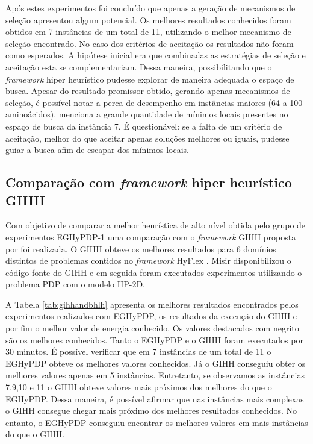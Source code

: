 	Após estes experimentos foi concluído que apenas a geração de mecanismos de seleção apresentou algum potencial. Os melhores resultados conhecidos foram obtidos em 7 instâncias de um total de 11, utilizando o melhor mecanismo de seleção encontrado. No caso dos critérios de aceitação os resultados não foram como esperados. A hipótese inicial era que combinadas as estratégias de seleção e aceitação esta se complementariam. Dessa maneira, possibilitando que o \textit{framework} hiper heurístico pudesse explorar de maneira adequada o espaço de busca. Apesar do resultado promissor obtido, gerando apenas mecanismos de seleção, é possível notar a perca de desempenho em instâncias maiores (64 a 100 aminoácidos). \cite{santanna2008} menciona a grande quantidade de mínimos locais presentes no espaço de busca da instância 7. É questionável: se a falta de um critério de aceitação, melhor do que aceitar apenas soluções melhores ou iguais, pudesse guiar a busca afim de escapar dos mínimos locais. 

	
	
	\subsection{Comparação com \textit{framework} hiper heurístico GIHH}
	
	Com objetivo de comparar a melhor heurística de alto nível obtida pelo grupo de experimentos EGHyPDP-1 uma comparação com o \textit{framework} GIHH proposta por \cite{misir2012intelligent} foi realizada. O GIHH obteve os melhores resultados para 6  domínios distintos de problemas contidos no \textit{framework} HyFlex \cite{ochoa2012hyflex}. Misir disponibilizou o código fonte do GIHH e em seguida foram executados experimentos utilizando o problema PDP com o modelo HP-2D.
	
	A Tabela \ref{tab:gihhandbhlh} apresenta os melhores resultados encontrados pelos experimentos realizados com EGHyPDP, os resultados da execução do GIHH e por fim o melhor valor de energia conhecido. Os valores destacados com negrito são os melhores conhecidos. Tanto o EGHyPDP e o GIHH foram executados por 30 minutos. É possível verificar que em 7 instâncias de um total de 11 o EGHyPDP obteve os melhores valores conhecidos. Já o GIHH conseguiu obter os melhores valores apenas em 5 instâncias. Entretanto, se observamos as instâncias 7,9,10 e 11 o GIHH obteve valores mais próximos dos melhores do que o EGHyPDP. Dessa maneira, é possível afirmar que nas instâncias mais complexas o GIHH consegue chegar mais próximo dos melhores resultados conhecidos. No entanto, o EGHyPDP conseguiu encontrar os melhores valores em mais instâncias do que o GIHH. 
	
